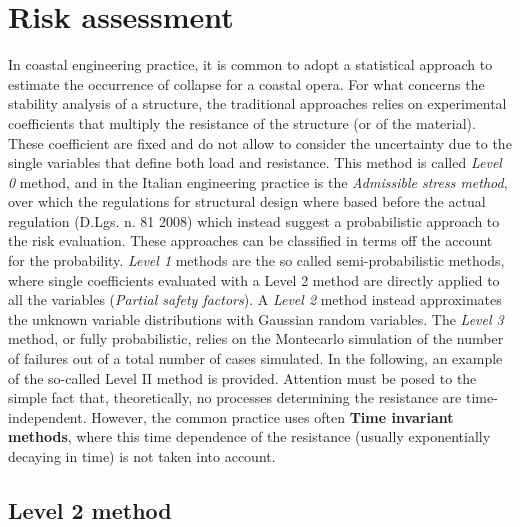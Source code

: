 \chapter{Risk assessment}
In coastal engineering practice, it is common to adopt a statistical approach to estimate the occurrence of collapse for a coastal opera. For what concerns the stability analysis of a structure, the traditional approaches relies on experimental coefficients that multiply the resistance of the structure (or of the material). These coefficient are fixed and do not allow to consider the uncertainty due to the single variables that define both load and resistance. This method is called \textit{Level 0} method, and in the Italian engineering practice is the \textit{Admissible stress method}, over which the regulations for structural design where based before the actual regulation (D.Lgs. n. 81 2008) which instead suggest a probabilistic approach to the risk evaluation. These approaches can be classified in terms off the account for the probability. \textit{Level 1} methods are the so called semi-probabilistic methods, where single coefficients evaluated with a Level 2 method are directly applied to all the variables (\textit{Partial safety factors}). A \textit{Level 2} method instead approximates the unknown variable distributions with Gaussian random variables. The \textit{Level 3} method, or fully probabilistic, relies on the Montecarlo simulation of the number of failures out of a total number of cases simulated. In the following, an example of the so-called Level II method is provided. Attention must be posed to the simple fact that, theoretically, no processes determining the resistance are time-independent. However, the common practice uses often \textbf{Time invariant methods}, where this time dependence of the resistance (usually exponentially decaying in time) is not taken into account. 
\section{Level 2 method}

